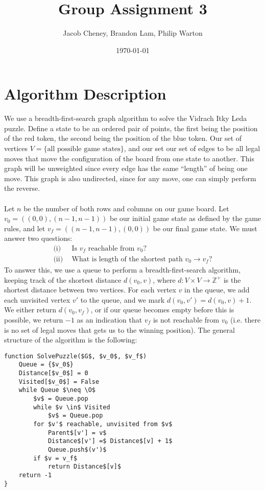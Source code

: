 \documentclass{article}
\theoremstyle{definition}
\begin{document}
\title{Group Assignment 3}
\author{Jacob Cheney, Brandon Lam, Philip Warton}
\date{\today}
\maketitle
\section{Algorithm Description}
    We use a breadth-first-search graph algorithm to solve the Vidrach Itky Leda puzzle.
    Define a state to be an ordered pair of points, the first being the position of the red token,
    the second being the position of the blue token. Our set of vertices $V = \{ \text{all possible game states}\}$,
    and our set our set of edges to be all legal moves that move the configuration of the board from one
    state to another. This graph will be unweighted since every edge has the same ``length'' of being one
    move. This graph is also undirected, since for any move, one can simply perform the reverse.\\\\
    Let $n$ be the number of both rows and columns on our game board.
    Let $v_0 = ((0,0),(n-1,n-1))$ be our initial game state as defined by the game rules, and let $v_f = ((n-1,n-1),(0,0))$
    be our final game state. We must answer two questions:
    \begin{align*}
        \text{(i)}& \ \ \text{Is $v_f$ reachable from $v_0$?}\\
        \text{(ii)}& \ \ \text{What is length of the shortest path $v_0 \rightarrow v_f$?}
    \end{align*}
    To answer this, we use a queue to perform a breadth-first-search algorithm, keeping track of the shortest
    distance $d(v_0, v)$, where $d:V \times V \rightarrow \mathbb{Z}^+$ is the shortest distance between two vertices.
    For each vertex $v$ in the queue, we add each unvisited vertex $v'$ to the queue, and we mark $d(v_0,v') = d(v_0, v) + 1$.
    We either return $d(v_0, v_f)$, or if our queue becomes empty before this is possible, we return $-1$ as an indication
    that $v_f$ is not reachable from $v_0$ (i.e. there is no set of legal moves that gets us to the winning position).
    The general structure of the algorithm is the following:
    \begin{mdframed}
        \begin{lstlisting}[mathescape=true]
function SolvePuzzle($G$, $v_0$, $v_f$)
    Queue = {$v_0$}
    Distance[$v_0$] = 0
    Visited[$v_0$] = False
    while Queue $\neq \O$ 
        $v$ = Queue.pop
        while $v \in$ Visited
            $v$ = Queue.pop
        for $v'$ reachable, unvisited from $v$
            Parent$[v'] = v$
            Distance$[v'] =$ Distance$[v] + 1$
            Queue.push$(v')$
        if $v = v_f$
            return Distance$[v]$
    return -1
}
        \end{lstlisting}
    \end{mdframed}  
\end{document}
